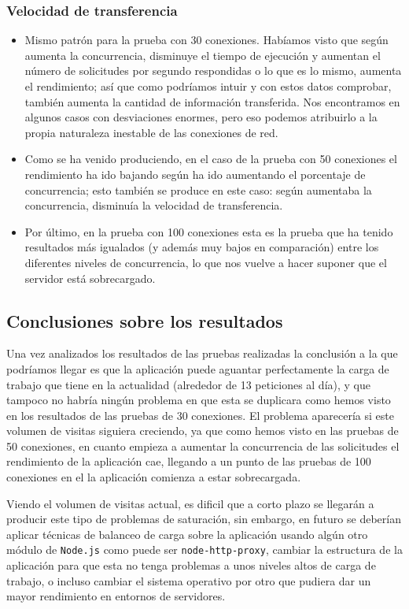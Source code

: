 \subsubsection{Velocidad de transferencia}
\begin{itemize}
	\item Mismo patrón para la prueba con 30 conexiones. Habíamos visto que según aumenta la concurrencia, disminuye el tiempo de ejecución y aumentan el número de solicitudes por segundo respondidas o lo que es lo mismo, aumenta el rendimiento; así que como podríamos intuir y con estos datos comprobar, también aumenta la cantidad de información transferida. Nos encontramos en algunos casos con desviaciones enormes, pero eso podemos atribuirlo a la propia naturaleza inestable de las conexiones de red.
	\item Como se ha venido produciendo, en el caso de la prueba con 50 conexiones el rendimiento ha ido bajando según ha ido aumentando el porcentaje de concurrencia; esto también se produce en este caso: según aumentaba la concurrencia, disminuía la velocidad de transferencia.
	\item Por último, en la prueba con 100 conexiones esta es la prueba que ha tenido resultados más igualados (y además muy bajos en comparación) entre los diferentes niveles de concurrencia, lo que nos vuelve a hacer suponer que el servidor está sobrecargado.
\end{itemize}

\subsection{Conclusiones sobre los resultados}

Una vez analizados los resultados de las pruebas realizadas la conclusión a la que podríamos llegar
es que la aplicación puede aguantar perfectamente la carga de trabajo que tiene en la actualidad (alrededor de 13 peticiones al día), y que tampoco no habría ningún problema en que esta se duplicara como hemos visto en los resultados de las pruebas de 30 conexiones. El problema aparecería si este volumen de visitas siguiera creciendo, ya que como hemos visto en las pruebas de 50 conexiones, en cuanto empieza a aumentar la concurrencia de las solicitudes el rendimiento de la aplicación cae, llegando a un punto de las pruebas de 100 conexiones en el la aplicación comienza a estar sobrecargada.

\bigskip
Viendo el volumen de visitas actual, es dificil que a corto plazo se llegarán a producir este tipo de problemas de saturación, sin embargo, en futuro se deberían aplicar técnicas de balanceo de carga sobre la aplicación usando algún otro módulo de {\tt Node.js} como puede ser {\tt node-http-proxy}, cambiar la estructura de la aplicación para que esta no tenga problemas a unos niveles altos de carga de trabajo, o incluso cambiar el sistema operativo por otro que pudiera dar un mayor rendimiento en entornos de servidores.

